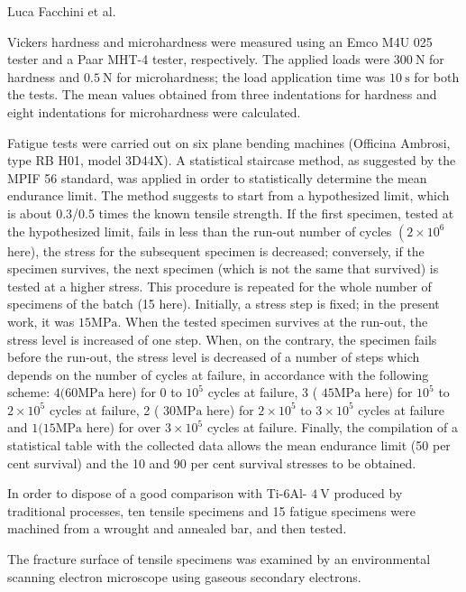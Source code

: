 \documentclass[10pt]{article}
\begin{document}
Luca Facchini et al.

Vickers hardness and microhardness were measured using an Emco M4U 025 tester and a Paar MHT-4 tester, respectively. The applied loads were $300 \mathrm{~N}$ for hardness and $0.5 \mathrm{~N}$ for microhardness; the load application time was $10 \mathrm{~s}$ for both the tests. The mean values obtained from three indentations for hardness and eight indentations for microhardness were calculated.

Fatigue tests were carried out on six plane bending machines (Officina Ambrosi, type RB H01, model 3D44X). A statistical staircase method, as suggested by the MPIF 56 standard, was applied in order to statistically determine the mean endurance limit. The method suggests to start from a hypothesized limit, which is about 0.3/0.5 times the known tensile strength. If the first specimen, tested at the hypothesized limit, fails in less than the run-out number of cycles $\left(2 \times 10^{6}\right.$ here), the stress for the subsequent specimen is decreased; conversely, if the specimen survives, the next specimen (which is not the same that survived) is tested at a higher stress. This procedure is repeated for the whole number of specimens of the batch (15 here). Initially, a stress step is fixed; in the present work, it was $15 \mathrm{MPa}$. When the tested specimen survives at the run-out, the stress level is increased of one step. When, on the contrary, the specimen fails before the run-out, the stress level is decreased of a number of steps which depends on the number of cycles at failure, in accordance with the following scheme: $4(60 \mathrm{MPa}$ here) for 0 to $10^{5}$ cycles at failure, 3 ( $45 \mathrm{MPa}$ here) for $10^{5}$ to $2 \times 10^{5}$ cycles at failure, 2 ( $30 \mathrm{MPa}$ here) for $2 \times 10^{5}$ to $3 \times 10^{5}$ cycles at failure and $1(15 \mathrm{MPa}$ here) for over $3 \times 10^{5}$ cycles at failure. Finally, the compilation of a statistical table with the collected data allows the mean endurance limit (50 per cent survival) and the 10 and 90 per cent survival stresses to be obtained.

In order to dispose of a good comparison with Ti-6Al- $4 \mathrm{~V}$ produced by traditional processes, ten tensile specimens and 15 fatigue specimens were machined from a wrought and annealed bar, and then tested.

The fracture surface of tensile specimens was examined by an environmental scanning electron microscope using gaseous secondary electrons.
\end{document}
